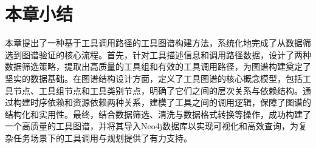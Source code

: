 

\section{本章小结}

本章提出了一种基于工具调用路径的工具图谱构建方法，系统化地完成了从数据筛选到图谱验证的核心流程。首先，针对工具描述信息和调用路径数据，设计了两种数据筛选策略，提取出高质量的工具组和有效的工具调用路径，为图谱构建奠定了坚实的数据基础。在图谱结构设计方面，定义了工具图谱的核心概念模型，包括工具节点、工具组节点和工具类别节点，明确了它们之间的层次关系与依赖结构。通过构建时序依赖和资源依赖两种关系，建模了工具之间的调用逻辑，保障了图谱的结构化和实用性。最终，结合数据筛选、清洗与数据格式转换等操作，成功构建了一个高质量的工具图谱，并将其导入Neo4j数据库以实现可视化和高效查询，为复杂任务场景下的工具调用与规划提供了有力支持。

